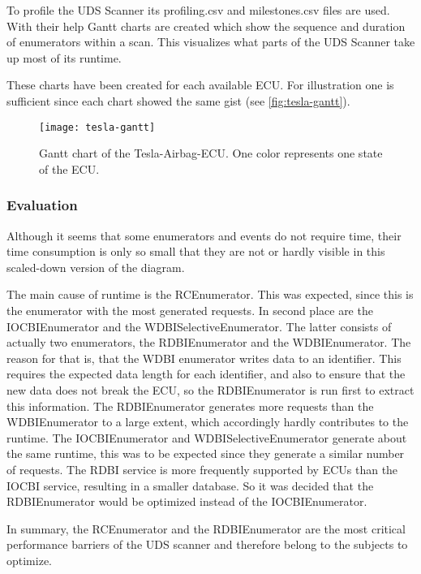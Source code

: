 To profile the UDS Scanner its profiling.csv and milestones.csv files are used. With their help Gantt charts are created which show the sequence and duration of enumerators within a scan. This visualizes what parts of the UDS Scanner take up most of its runtime.

These charts have been created for each available ECU. For illustration one is sufficient since each chart showed the same gist (see \autoref{fig:tesla-gantt}).

\begin{figure}[h]
    \centering
    \texttt{[image: tesla-gantt]}
    \caption{Gantt chart of the Tesla-Airbag-ECU. One color represents one state of the ECU.}
    \label{fig:tesla-gantt}
\end{figure}



\subsubsection{Evaluation}

Although it seems that some enumerators and events do not require time, their time consumption is only so small that they are not or hardly visible in this scaled-down version of the diagram.

The main cause of runtime is the RCEnumerator. This was expected, since this is the enumerator with the most generated requests.
In second place are the IOCBIEnumerator and the WDBISelectiveEnumerator.
The latter consists of actually two enumerators, the RDBIEnumerator and the WDBIEnumerator. The reason for that is, that the WDBI enumerator writes data to an identifier. This requires the expected data length for each identifier, and also to ensure that the new data does not break the ECU, so the RDBIEnumerator is run first to extract this information.
The RDBIEnumerator generates more requests than the WDBIEnumerator to a large extent, which accordingly hardly contributes to the runtime.
The IOCBIEnumerator and WDBISelectiveEnumerator generate about the same runtime, this was to be expected since they generate a similar number of requests. The RDBI service is more frequently supported by ECUs than the IOCBI service, resulting in a smaller database. So it was decided that the RDBIEnumerator would be optimized instead of the IOCBIEnumerator.

In summary, the RCEnumerator and the RDBIEnumerator are the most critical performance barriers of the UDS scanner and therefore belong to the subjects to optimize.

